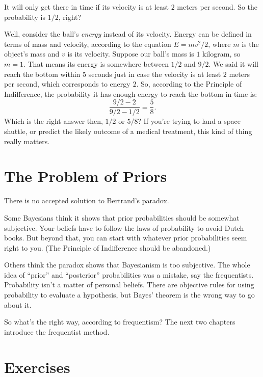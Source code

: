 \documentclass[justified]{tufte-book}
\theoremstyle{definition}
\theoremstyle{definition}
\theoremstyle{definition}
\theoremstyle{definition}
\theoremstyle{remark}
\begin{document}
It will only get there in time if its velocity is at least \(2\) meters per second. So the probability is \(1/2\), right?

Well, consider the ball's \emph{energy} instead of its velocity. Energy can be defined in terms of mass and velocity, according to the equation \(E = mv^2/2\), where \(m\) is the object's mass and \(v\) is its velocity. Suppose our ball's mass is \(1\) kilogram, so \(m = 1\). That means its energy is somewhere between \(1/2\) and \(9/2\). We said it will reach the bottom within \(5\) seconds just in case the velocity is at least \(2\) meters per second, which corresponds to energy \(2\). So, according to the Principle of Indifference, the probability it has enough energy to reach the bottom in time is:
\[ \frac{9/2 - 2}{9/2 - 1/2} = \frac{5}{8}. \]
Which is the right answer then, \(1/2\) or \(5/8\)? If you're trying to land a space shuttle, or predict the likely outcome of a medical treatment, this kind of thing really matters.

\hypertarget{the-problem-of-priors}{%
\section{The Problem of Priors}\label{the-problem-of-priors}}

There is no accepted solution to Bertrand's paradox.

Some Bayesians think it shows that prior probabilities should be somewhat subjective. Your beliefs have to follow the laws of probability to avoid Dutch books. But beyond that, you can start with whatever prior probabilities seem right to you. (The Principle of Indifference should be abandoned.)

Others think the paradox shows that Bayesianism is too subjective. The whole idea of ``prior'' and ``posterior'' probabilities was a mistake, say the frequentists. Probability isn't a matter of personal beliefs. There are objective rules for using probability to evaluate a hypothesis, but Bayes' theorem is the wrong way to go about it.

So what's the right way, according to frequentism? The next two chapters introduce the frequentist method.

\hypertarget{exercises-16}{%
\section*{Exercises}\label{exercises-16}}
\end{document}
